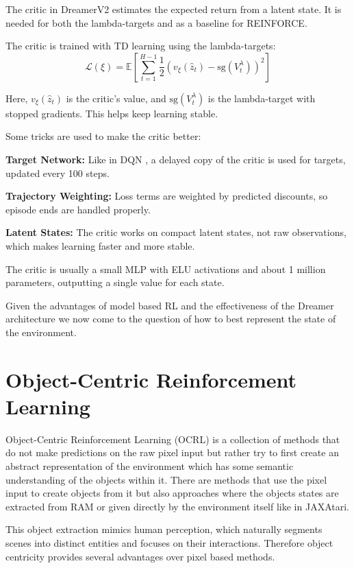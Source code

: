 \documentclass[
	english,
	ruledheaders=section,
	class=report,
	thesis={type=master},
	accentcolor=9c,
	custommargins=true,
	marginpar=false,
	parskip=half-,
	fontsize=11pt,
]{tudapub}
\begin{document}
The critic in DreamerV2 estimates the expected return from a latent state. It
is needed for both the lambda-targets and as a baseline for REINFORCE.

The critic is trained with TD learning using the lambda-targets:
\begin{equation}
	\mathcal{L}(\xi) = \mathbb{E}\left[\sum_{t=1}^{H-1} \frac{1}{2} \left(v_\xi(\hat{z}_t) - \text{sg}(V^{\lambda}_t)\right)^2\right]
\end{equation}

Here, $v_\xi(\hat{z}_t)$ is the critic's value, and $\text{sg}(V^{\lambda}_t)$
is the lambda-target with stopped gradients. This helps keep learning stable.

Some tricks are used to make the critic better:

\textbf{Target Network:} Like in DQN \cite{DQN}, a delayed copy of the critic is used for targets, updated every 100 steps.

\textbf{Trajectory Weighting:} Loss terms are weighted by predicted discounts, so episode ends are handled properly.

\textbf{Latent States:} The critic works on compact latent states, not raw observations, which makes learning faster and more stable.

The critic is usually a small MLP with ELU activations and about 1 million
parameters, outputting a single value for each state.

Given the advantages of model based RL and the effectiveness of the Dreamer
architecture we now come to the question of how to best represent the state of
the environment.

\section{Object-Centric Reinforcement Learning}
\label{sec:object_centric_rl}

Object-Centric Reinforcement Learning (OCRL) is a collection of methods that do
not make predictions on the raw pixel input but rather try to first create an
abstract representation of the environment which has some semantic
understanding of the objects within it. There are methods that use the pixel
input to create objects from it \cite{locatello2020object} but also approaches
where the objects states are extracted from RAM \cite{delfosse2023ocatari} or
given directly by the environment itself like in JAXAtari.

This object extraction mimics human perception, which naturally segments scenes
into distinct entities and focuses on their interactions. Therefore object centricity provides several advantages over pixel based
methods.
\end{document}
